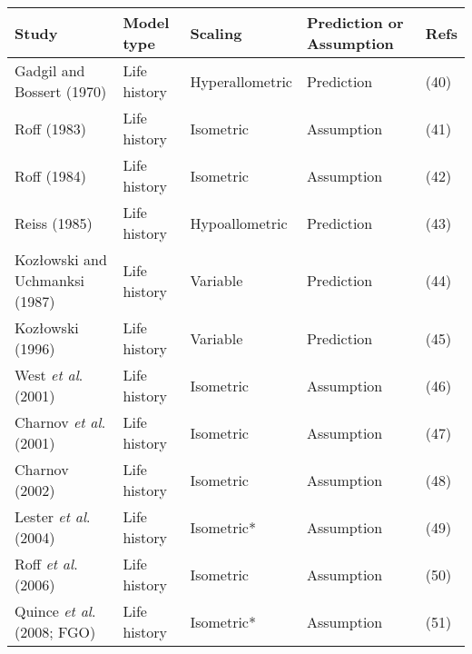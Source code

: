 \documentclass[a4paper]{article} %
\begin{document}
    \begin{table}[]
        \begin{tabular}{|l|l|l|l|l|}
        \hline
        \textbf{Study}                          & \textbf{Model type} & \textbf{Scaling} & \textbf{Prediction or Assumption} & \textbf{Refs} \\ \hline
        Gadgil and Bossert (1970)               & Life history        & Hyperallometric  & Prediction                        & (40)          \\ \hline
        Roff (1983)                             & Life history        & Isometric        & Assumption                        & (41)          \\ \hline
        Roff (1984)                             & Life history        & Isometric        & Assumption                        & (42)          \\ \hline
        Reiss (1985)                            & Life history        & Hypoallometric   & Prediction                        & (43)          \\ \hline
        Koz\l{}owski and Uchmanksi (1987)          & Life history        & Variable         & Prediction                        & (44)          \\ \hline
        Koz\l{}owski (1996)                        & Life history        & Variable         & Prediction                        & (45)          \\ \hline
        West \textit{et al}. (2001)             & Life history        & Isometric        & Assumption                        & (46)          \\ \hline
        Charnov \textit{et al}. (2001)          & Life history        & Isometric        & Assumption                        & (47)          \\ \hline
        Charnov (2002)                          & Life history        & Isometric        & Assumption                        & (48)          \\ \hline
        Lester \textit{et al}. (2004)           & Life history        & Isometric*       & Assumption                        & (49)          \\ \hline
        Roff \textit{et al}. (2006)             & Life history        & Isometric        & Assumption                        & (50)          \\ \hline
        Quince \textit{et al}. (2008; FGO)      & Life history        & Isometric*       & Assumption                        & (51)          \\ \hline

\end{tabular}
\end{table}
\end{document}
